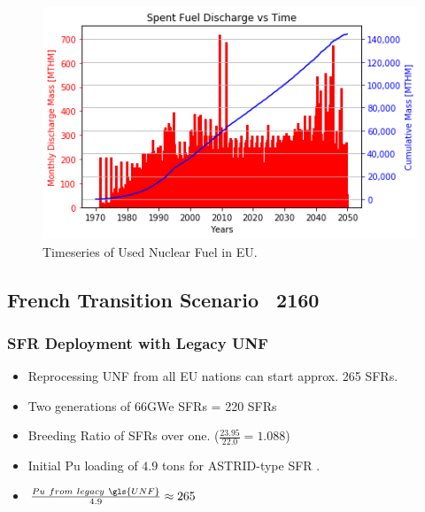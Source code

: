 \begin{frame}

\begin{figure}[htbp!]
	\begin{center}
			\includegraphics[scale=0.7]{./images/eu_future/snf_discharge.png}
	\end{center}
	\caption{Timeseries of Used Nuclear Fuel in \gls{EU}.}
	\label{fig:eu_snf}
\end{figure}

\end{frame}

\subsection{French Transition Scenario ~2160}

\begin{frame}
	\frametitle{SFR Deployment with Legacy UNF}
	\begin{itemize}
		\item Reprocessing UNF from all EU nations can start approx. 265 SFRs.
		\item Two generations of 66GWe SFRs = 220 SFRs
		\item Breeding Ratio of SFRs over one. ($\frac{23.95}{22.0} = 1.088$)
		\item Initial Pu loading of $4.9$ tons for ASTRID-type SFR \cite{varaine_pre-conceptual_2012}.
		\item $\frac{Pu \ from \ legacy \ \gls{UNF}}{4.9} \approx 265$
	\end{itemize}
\end{frame}

